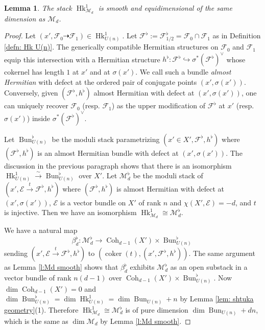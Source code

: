\documentclass[reqno]{amsart}
\numberwithin{equation}{section}
\newcommand{\Cal}[1]{\mathcal{#1}}
\newcommand{\inj}{\hookrightarrow}
\DeclareMathOperator{\coker}{coker}
\DeclareMathOperator{\Bun}{Bun}
\DeclareMathOperator{\Hk}{Hk}
\DeclareMathOperator{\Coh}{Coh}
\newcommand{\isom}{\stackrel{\sim}{\to}}
\newcommand\xr{\xrightarrow}
\renewcommand\b\beta
\newcommand{\s}{\sigma}
\newcommand\cE{\mathcal{E}}
\newcommand\cF{\mathcal{F}}
\newcommand\cM{\mathcal{M}}
\newtheorem{lemma}[thm]{Lemma}
\theoremstyle{remark}
\numberwithin{equation}{section}
\begin{document}
\begin{lemma}\label{l:HkMd sm} The stack $\Hk^{1}_{\cM_{d}}$ is smooth and equidimensional of the same dimension as $\cM_{d}$.
\end{lemma}
\begin{proof}
Let $(x',\Cal{F}_0 \dashrightarrow \Cal{F}_1) \in \Hk_{U(n)}^1$. Let $\cF^{\flat}:=\cF^{\flat}_{1/2}=\Cal{F}_0 \cap \Cal{F}_1$ as in Definition \ref{defn: Hk U(n)}. 
The generically compatible Hermitian structures on $\Cal{F}_0$ and $\Cal{F}_1$ equip this intersection with a Hermitian structure $h^{\flat}: \cF^{\flat} \inj \sigma^* (\Cal{F}^{\flat})^{\vee}$ whose cokernel has length $1$ at $x'$ and at $\sigma (x')$. We call such a bundle {\em almost Hermitian} with defect at the ordered pair of conjugate points $(x',\s(x'))$. Conversely, given $(\Cal{F}^{\flat},h^{\flat})$ almost Hermitian with defect at $(x', \s(x'))$, one can uniquely recover $\cF_{0}$ (resp. $\cF_{1}$) as the upper modification of $\cF^{\flat}$ at $x'$ (resp. $\s(x')$) inside $\s^{*}(\cF^{\flat})^{\vee}$.  

Let $\Bun^{\flat}_{U(n)}$ be the moduli stack parametrizing  $(x'\in X', \cF^{\flat}, h^{\flat})$ where $(\cF^{\flat}, h^{\flat})$ is an almost Hermitian bundle with defect at $(x',\sigma(x'))$. The discussion in the previous paragraph shows that there is an isomorphism $\Hk^{1}_{U(n)}\isom \Bun^{\flat}_{U(n)}$ over $X'$.  
Let $\cM^{\flat}_{d}$ be the moduli stack of $(x',\cE\xr{t}\cF^{\flat}, h^{\flat})$ where $(\cF^{\flat}, h^{\flat})$ is almost Hermitian with defect at $(x',\s(x'))$, $\cE$ is a vector bundle on $X'$ of rank $n$ and $\chi(X',\cE)=-d$, and $t$ is injective. Then we have an isomorphism $\Hk^{1}_{\cM_{d}}\cong \cM^{\flat}_{d}$.  


We have a natural map 
\begin{equation}
\b^{\flat}_{d}: \cM^{\flat}_{d}\to \Coh_{d-1}(X')\times \Bun^{\flat}_{U(n)}
\end{equation}
sending $(x',\cE\xr{t}\cF^{\flat}, h^{\flat})$ to $(\coker(t), (x',\cF^{\flat}, h^{\flat}))$. The same argument as Lemma \ref{l:Md smooth} shows that $\b^{\flat}_{d}$ exhibits $\cM^{\flat}_{d}$ as an open substack in a vector bundle of rank $n(d-1)$ over $\Coh_{d-1}(X')\times \Bun^{\flat}_{U(n)}$. Now $\dim \Coh_{d-1}(X')=0$ and $\dim \Bun^{\flat}_{U(n)}=\dim \Hk^{1}_{U(n)}=\dim \Bun_{U(n)}+n$ by Lemma \ref{lem: shtuka geometry}(1). Therefore $\Hk^{1}_{\cM_{d}}\cong \cM^{\flat}_{d}$ is of pure dimension $\dim \Bun_{U(n)}+dn$, which is the same as $\dim \cM_{d}$ by Lemma \ref{l:Md smooth}.
\end{proof}
\end{document}
